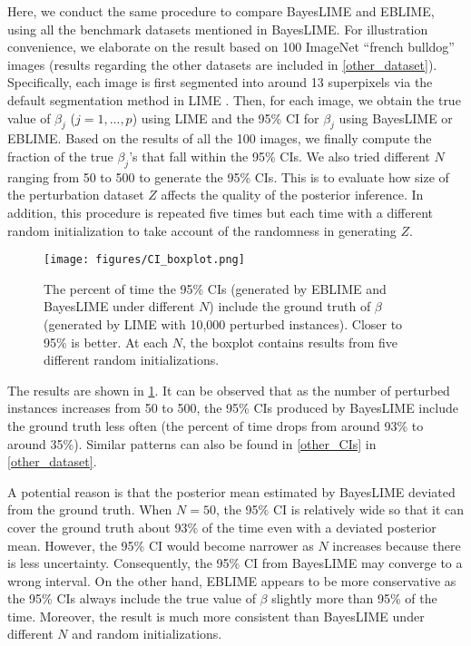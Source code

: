 \documentclass{article}
\theoremstyle{plain}
\theoremstyle{definition}
\theoremstyle{remark}
\begin{document}
Here, we conduct the same procedure to compare BayesLIME and EBLIME, using all the benchmark datasets mentioned in BayesLIME. For illustration convenience, we elaborate on the result based on 100 ImageNet ``french bulldog'' images (results regarding the other datasets are included in \cref{other_dataset}). Specifically, each image is first segmented into around 13 superpixels via the default segmentation method in LIME \cite{lime}. Then, for each image, we obtain the true value of $\beta_j$ ($j=1,...,p$) using LIME and the 95\% CI for $\beta_j$ using BayesLIME or EBLIME. Based on the results of all the 100 images, we finally compute the fraction of the true $\beta_j$'s that fall within the 95\% CIs. We also tried different $N$ ranging from 50 to 500 to generate the 95\% CIs. This is to evaluate how size of the perturbation dataset $Z$ affects the quality of the posterior inference. In addition, this procedure is repeated five times but each time with a different random initialization to take account of the randomness in generating $Z$. 

\begin{figure}[hbt]
\begin{center}
\centerline{\texttt{[image: figures/CI\_boxplot.png]}}
\caption{The percent of time the 95\% CIs (generated by EBLIME and BayesLIME under different $N$) include the ground truth of $\beta$ (generated by LIME with 10,000 perturbed instances). Closer to 95\% is better. At each $N$, the boxplot contains results from five different random initializations.}
\label{CIs}
\end{center}
\end{figure}

The results are shown in \cref{CIs}. It can be observed that as the number of perturbed instances increases from 50 to 500, the 95\% CIs produced by BayesLIME include the ground truth less often (the percent of time drops from around 93\% to around 35\%). Similar patterns can also be found in \cref{other_CIs} in \cref{other_dataset}. 



A potential reason is that the posterior mean estimated by BayesLIME deviated from the ground truth. When $N=50$, the 95\% CI is relatively wide so that it can cover the ground truth about 93\% of the time even with a deviated posterior mean. However, the 95\% CI would become narrower as $N$ increases because there is less uncertainty. Consequently, the 95\% CI from BayesLIME may converge to a wrong interval. On the other hand, EBLIME appears to be more conservative as the 95\% CIs always include the true value of $\beta$ slightly more than 95\% of the time. Moreover, the result is much more consistent than BayesLIME under different $N$ and random initializations.
\end{document}
